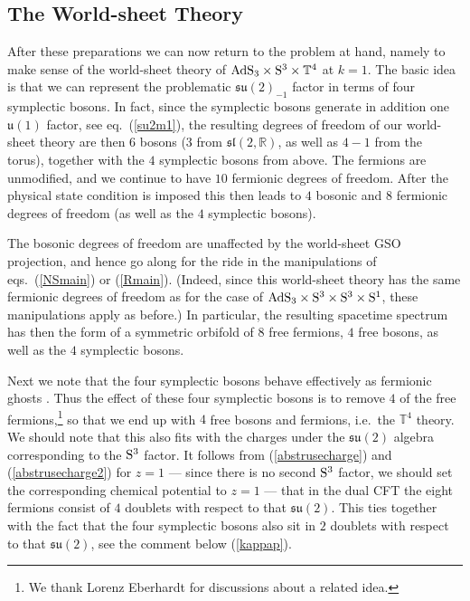 \documentclass[12pt,a4paper]{article}
\begin{document}
\subsection{The World-sheet Theory}

After these preparations we can now return to the problem at hand, namely to make sense of the world-sheet theory of ${\rm AdS}_3\times {\rm S}^3 \times \mathbb{T}^4$ at $k=1$. The basic idea is that we can represent the problematic $\mathfrak{su}(2)_{-1}$ factor in terms of four symplectic bosons. In fact, since the symplectic bosons generate in addition one $\mathfrak{u}(1)$ factor, see eq.~(\ref{su2m1}), the resulting degrees of freedom of our world-sheet theory are then $6$ bosons ($3$ from $\mathfrak{sl}(2,\mathbb{R})$, as well as $4-1$ from the torus), together with the $4$ symplectic bosons from above. The fermions are unmodified, and we continue to have $10$ fermionic degrees of freedom.  After the physical state condition is imposed this then leads to $4$ bosonic and $8$ fermionic degrees of freedom (as well as the $4$ symplectic bosons). 

The bosonic degrees of freedom are unaffected by the world-sheet GSO projection, and hence go along for the ride in the manipulations of eqs.~(\ref{NSmain}) or (\ref{Rmain}). (Indeed, since this world-sheet theory has the same fermionic degrees of freedom as for the case of ${\rm AdS}_3 \times {\rm S}^3 \times {\rm S}^3 \times {\rm S}^1$, these manipulations apply as before.) In particular, the resulting spacetime spectrum has then the form of a symmetric orbifold of $8$ free fermions, $4$ free bosons, as well as the $4$ symplectic bosons. 

Next we note that the four symplectic bosons behave effectively as fermionic ghosts  \cite{Goddard:1987td}. Thus the effect of these four symplectic bosons is to remove $4$ of the free fermions,\footnote{We thank Lorenz Eberhardt for discussions about a related idea.} so that we end up with $4$ free bosons and fermions, i.e.\ the $\mathbb{T}^4$ theory. 
We should note that this also fits with the charges under the $\mathfrak{su}(2)$ algebra corresponding to the ${\rm S}^3$ factor. 
It follows from (\ref{abstrusecharge}) and (\ref{abstrusecharge2}) for $z=1$ --- since there is no second ${\rm S}^3$ factor, we should set the corresponding chemical potential to $z=1$ --- that in the dual CFT the eight fermions consist of $4$ doublets with respect to that $\mathfrak{su}(2)$. This ties together with the fact that the four symplectic bosons also sit in $2$ doublets with respect to that $\mathfrak{su}(2)$, see the comment below (\ref{kappap}). 
\end{document}
